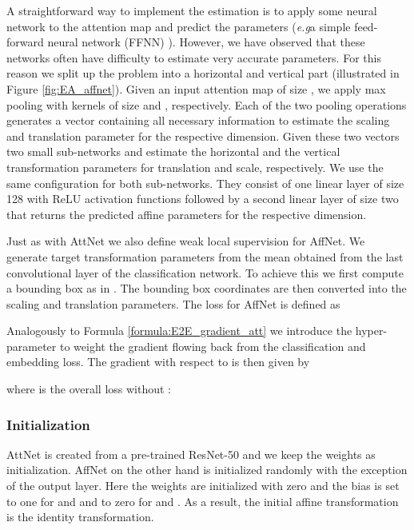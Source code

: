 \documentclass{bmvc2k}
\def\eg{\emph{e.g}\bmvaOneDot}
\begin{document}
A straightforward way to implement the estimation is to apply some neural network to the attention map and predict the parameters (\eg a simple feed-forward neural network (FFNN) \cite{fu2017look}). However, we have observed that these networks often have difficulty to estimate very accurate parameters. For this reason we split up the problem into a horizontal and vertical part (illustrated in Figure \ref{fig:EA_affnet}). Given an input attention map of size , we apply max pooling with kernels of size  and , respectively. Each of the two pooling operations generates a vector containing all necessary information to estimate the scaling and translation parameter for the respective dimension. Given these two vectors two small sub-networks  and  estimate the horizontal and the vertical transformation parameters for translation and scale, respectively. We use the same configuration for both sub-networks. They consist of one linear layer of size 128 with ReLU activation functions followed by a second linear layer of size two that returns the predicted affine parameters for the respective dimension.

Just as with AttNet we also define weak local supervision for AffNet. We generate target transformation parameters  from the mean  obtained from the last convolutional layer of the classification network. To achieve this we first compute a bounding box as in \cite{Hanselmann_2020_WACV}. The bounding box coordinates are then converted into the scaling and translation parameters. The loss for AffNet is defined as



Analogously to Formula \ref{formula:E2E_gradient_att} we introduce the hyper-parameter  to weight the gradient flowing back from the classification and embedding loss. The gradient with respect to  is then given by



where  is the overall loss without :



\subsubsection{Initialization}
AttNet is created from a pre-trained ResNet-50 and we keep the weights as initialization. AffNet on the other hand is initialized randomly with the exception of the output layer. Here the weights are initialized with zero and the bias is set to one for  and  and to zero for  and . As a result, the initial affine transformation is the identity transformation.
\end{document}
